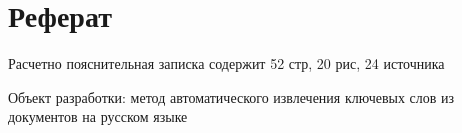 \section{Реферат}
Расчетно пояснительная записка содержит 52 стр, 20 рис, 24 источника

Объект разработки: метод автоматического извлечения ключевых слов из документов на русском языке